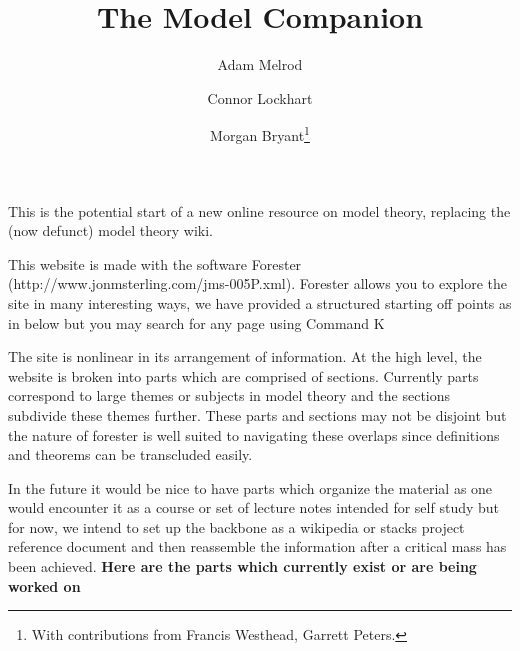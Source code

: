 \documentclass[a4paper]{article}
\title{The Model Companion}
\date{}
\author{Adam Melrod \and Connor Lockhart \and Morgan Bryant\thanks{With contributions from Francis Westhead, Garrett Peters.}}
\begin{document}
\maketitle
\par{This is the potential start of a new online resource on model theory, replacing the (now defunct) model theory wiki.}\par{This website is made with the software Forester (http://www.jonmsterling.com/jms-005P.xml). Forester allows you to explore the site in many interesting ways, we have provided a structured starting off points as in below but you may search for any page using Command K}\par{The site is nonlinear in its arrangement of information. At the high level, the website is broken into parts which are comprised of sections. Currently parts correspond to large themes or subjects in model theory and the sections subdivide these themes further. These parts and sections may not be disjoint but the nature of forester is well suited to navigating these overlaps since definitions and theorems can be transcluded easily. }\par{In the future it would be nice to have parts which organize the material as one would encounter it as a course or set of lecture notes intended for self study but for now, we intend to set up the backbone as a wikipedia or stacks project reference document and then reassemble the information after a critical mass has been achieved. }\textbf{Here are the parts which currently exist or are being worked on}
  
\end{document}
